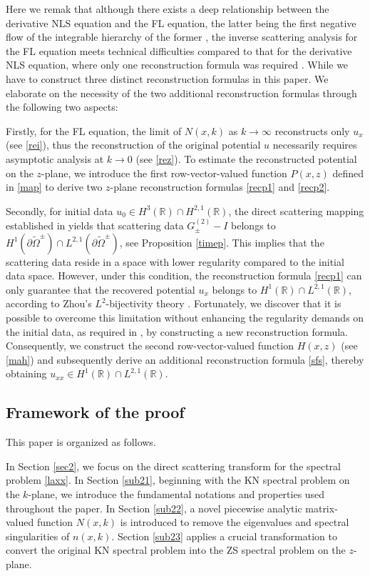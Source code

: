 \documentclass[preprint,compress,12pt]{elsarticle}
\numberwithin{equation}{section}
\begin{document}
Here we remak that although  there exists a deep relationship between the derivative NLS equation and the FL equation, the latter being the first negative flow of the integrable hierarchy of the former \cite{Kundu,Lenells},
 the inverse scattering analysis for the FL equation meets technical  difficulties   compared to that for the derivative NLS equation, where  only one reconstruction formula was  required \cite{Jenkins}.
While we have to construct three distinct reconstruction formulas in this paper.
We elaborate on the necessity of the two additional reconstruction formulas
through the following two aspects:

Firstly, for the FL equation, the limit of $N(x,k)$ as $k\to\infty$ reconstructs only $u_{x}$ (see \eqref{rei}), thus the reconstruction of the original  potential $u$ necessarily requires asymptotic analysis at $k\to0$ (see \eqref{rez}). To estimate the reconstructed potential on the $z$-plane, we introduce the first row-vector-valued function $P(x,z)$  defined in \eqref{map} to  derive   two $z$-plane reconstruction formulas \eqref{recp1} and \eqref{recp2}.

Secondly, for initial data $u_{0}\in H^{3}(\mathbb{R})\cap H^{2,1}(\mathbb{R})$, the direct scattering mapping established in \cite{Chengglo} yields that scattering data $G^{(2)}_{\pm}-I$ belongs to $H^{1}(\partial\widetilde{\Omega}^{\pm})\cap L^{2,1}(\partial\widetilde{\Omega}^{\pm})$, see Proposition \ref{timep}. This implies that the scattering data reside in a space with lower regularity compared to the initial data space. However, under this condition, the reconstruction formula \eqref{recp1} can only guarantee that the recovered potential $u_{x}$ belongs to $H^{1}(\mathbb{R})\cap L^{2,1}(\mathbb{R})$, according to Zhou's $L^{2}$-bijectivity theory \cite{Zhou1998}.  Fortunately, we discover that it is possible to overcome this limitation without enhancing the regularity demands on the initial data, as required in \cite{Jenkins}, by constructing a new reconstruction formula. Consequently, we construct the second row-vector-valued function $H(x,z)$ (see \eqref{mah}) and subsequently derive an additional reconstruction formula \eqref{sfs}, thereby obtaining $u_{xx}\in H^{1}(\mathbb{R})\cap L^{2,1}(\mathbb{R})$.
\subsection{Framework of the proof}
This paper is organized as follows.

In Section \ref{sec2}, we focus on the direct scattering transform for the spectral problem \eqref{laxx}. In Section \ref{sub21}, beginning with the KN spectral problem on the $k$-plane, we introduce the fundamental notations and properties used throughout the paper. In Section \ref{sub22}, a novel piecewise analytic matrix-valued function $N(x,k)$ is introduced to remove the eigenvalues and spectral singularities of $n(x,k)$. Section \ref{sub23}  applies a crucial transformation to convert the original KN spectral problem into the ZS spectral problem on the $z$-plane.
\end{document}
